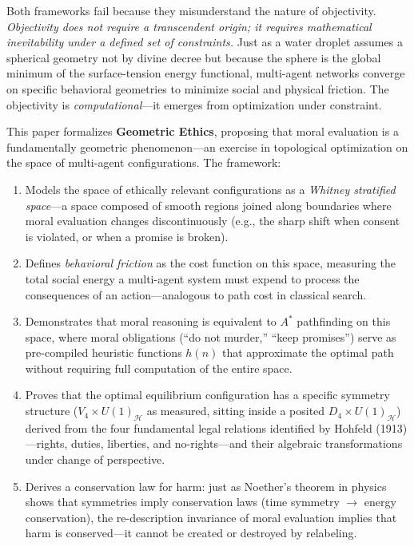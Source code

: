 \documentclass[12pt,letterpaper]{article}
\theoremstyle{definition}
\theoremstyle{remark}
\newcommand{\harm}{\mathcal{H}}
\begin{document}
Both frameworks fail because they misunderstand the nature of objectivity. \emph{Objectivity does not require a transcendent origin; it requires mathematical inevitability under a defined set of constraints.} Just as a water droplet assumes a spherical geometry not by divine decree but because the sphere is the global minimum of the surface-tension energy functional, multi-agent networks converge on specific behavioral geometries to minimize social and physical friction. The objectivity is \emph{computational}---it emerges from optimization under constraint.

This paper formalizes \textbf{Geometric Ethics}, proposing that moral evaluation is a fundamentally geometric phenomenon---an exercise in topological optimization on the space of multi-agent configurations. The framework:

\begin{enumerate}[label=(\roman*)]
    \item Models the space of ethically relevant configurations as a \emph{Whitney stratified space}---a space composed of smooth regions joined along boundaries where moral evaluation changes discontinuously (e.g., the sharp shift when consent is violated, or when a promise is broken).
    \item Defines \emph{behavioral friction} as the cost function on this space, measuring the total social energy a multi-agent system must expend to process the consequences of an action---analogous to path cost in classical search.
    \item Demonstrates that moral reasoning is equivalent to $A^*$ pathfinding on this space, where moral obligations (``do not murder,'' ``keep promises'') serve as pre-compiled heuristic functions $h(n)$ that approximate the optimal path without requiring full computation of the entire space.
    \item Proves that the optimal equilibrium configuration has a specific symmetry structure ($V_4 \times U(1)_\harm$ as measured, sitting inside a posited $D_4 \times U(1)_\harm$) derived from the four fundamental legal relations identified by Hohfeld (1913)---rights, duties, liberties, and no-rights---and their algebraic transformations under change of perspective.
    \item Derives a conservation law for harm: just as Noether's theorem in physics shows that symmetries imply conservation laws (time symmetry $\to$ energy conservation), the re-description invariance of moral evaluation implies that harm is conserved---it cannot be created or destroyed by relabeling.
\end{enumerate}
\end{document}
